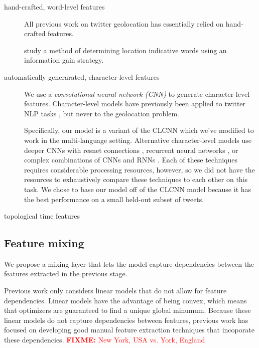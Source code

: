 \documentclass[sigconf,10pt]{acmart}
\newcommand{\defn}[1]{\textit{#1}}
\newcommand{\fixme}[1]{\textcolor{red}{\textbf{FIXME:} {#1}}}
\begin{document}
\begin{description}
    \item[hand-crafted, word-level features]
        All previous work on twitter geolocation has essentially relied on hand-crafted features.

        \citet{han2012geolocation} study a method of determining location indicative words using an information gain strategy.


    \item[automatically generarated, character-level features]
        We use a \defn{convolutional neural network (CNN)} to generate character-level features.
        Character-level models have previously been applied to twitter NLP tasks \citep[e.g.][]{dhingra2016tweet2vec,severyn2015unitn},
        but never to the geolocation problem.

        Specifically, our model is a variant of the CLCNN \citep{zhang2015character} which we've modified to work in the multi-language setting.
        Alternative character-level models use deeper CNNs with resnet connections \citep{conneau2017very}, recurrent neural networks \citep{chung2016character}, or complex combinations of CNNs and RNNs \citep{kim2016character,jozefowicz2016exploring}.
        Each of these techniques requires considerable processing resources, however, 
        so we did not have the resources to exhaustively compare these techniques to each other on this task.
        We chose to base our model off of the CLCNN model because it has the best performance on a small held-out subset of tweets.

    \item[topological time features]
\end{description}

\subsection{Feature mixing}

We propose a mixing layer that lets the model capture dependencies between the features extracted in the previous stage.

Previous work only considers linear models that do not allow for feature dependencies.
Linear models have the advantage of being convex,
which means that optimizers are guaranteed to find a unique global minumum.
Because these linear models do not capture dependencies between features,
previous work has focused on developing good manual feature extraction techniques that incoporate these dependencies.
\fixme{New York, USA vs. York, England}
\end{document}
